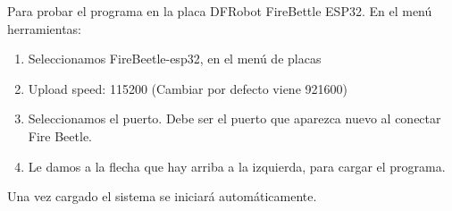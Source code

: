 \begin{tcolorbox}
[colback=red!5!white,colframe=red!75!black,fonttitle=\bfseries,title=DFRobot FireBeetle-esp32 V4.0 ]
Para probar el programa en la placa DFRobot FireBettle ESP32. En el menú herramientas:
\begin{enumerate}
\item Seleccionamos FireBeetle-esp32, en el menú de placas
\item Upload speed: 115200 (Cambiar por defecto viene 921600)
\item Seleccionamos el puerto. Debe ser el puerto que aparezca nuevo al conectar Fire Beetle.
\item Le damos a la flecha que hay arriba a la izquierda, para cargar el programa.
\end{enumerate}
\end{tcolorbox}

Una vez cargado el sistema se iniciará automáticamente.











